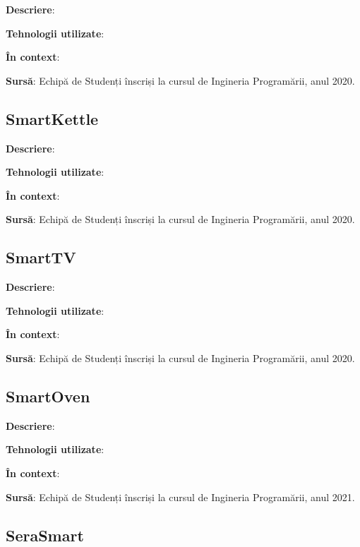 \textbf{Descriere}: 

\textbf{Tehnologii utilizate}: 

\textbf{În context}: 

\textbf{Sursă}: Echipă de Studenți înscriși la cursul de Ingineria Programării, anul 2020.

\subsection*{SmartKettle}

\textbf{Descriere}:  

\textbf{Tehnologii utilizate}: 

\textbf{În context}: 

\textbf{Sursă}: Echipă de Studenți înscriși la cursul de Ingineria Programării, anul 2020.

\subsection*{SmartTV}

\textbf{Descriere}: 

\textbf{Tehnologii utilizate}: 

\textbf{În context}: 

\textbf{Sursă}: Echipă de Studenți înscriși la cursul de Ingineria Programării, anul 2020.

\subsection*{SmartOven}

\textbf{Descriere}: 

\textbf{Tehnologii utilizate}: 

\textbf{În context}: 

\textbf{Sursă}: Echipă de Studenți înscriși la cursul de Ingineria Programării, anul 2021.

\subsection*{SeraSmart}

